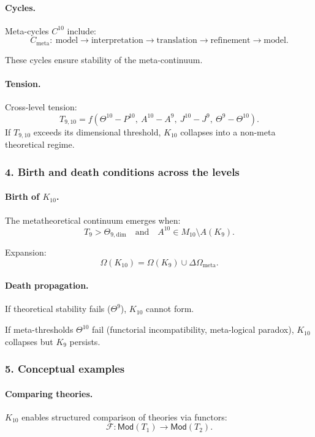 \paragraph{Cycles.}
Meta-cycles $C^{10}$ include:
\[
C_{\mathrm{meta}}:\
\text{model} \rightarrow \text{interpretation} \rightarrow \text{translation}
\rightarrow \text{refinement} \rightarrow \text{model}.
\]

These cycles ensure stability of the meta-continuum.

\paragraph{Tension.}
Cross-level tension:
\[
T_{9,10} =
f(\Theta^{10} - P^{10},\ A^{10} - A^9,\
  J^{10} - J^9,\ \Theta^9 - \Theta^{10}).
\]
If $T_{9,10}$ exceeds its dimensional threshold, $K_{10}$ collapses into a
non-meta theoretical regime.

\subsubsection{4. Birth and death conditions across the levels}

\paragraph{Birth of $K_{10}$.}
The metatheoretical continuum emerges when:
\[
T_9 > \Theta_{9,\mathrm{dim}}
\quad\text{and}\quad
A^{10} \in M_{10} \setminus A(K_9).
\]

Expansion:
\[
\Omega(K_{10}) = \Omega(K_9) \cup \Delta\Omega_{\mathrm{meta}}.
\]

\paragraph{Death propagation.}
If theoretical stability fails ($\Theta^9$), $K_{10}$ cannot form.

If meta-thresholds $\Theta^{10}$ fail (functorial incompatibility,
meta-logical paradox), $K_{10}$ collapses but $K_9$ persists.

\subsubsection{5. Conceptual examples}

\paragraph{Comparing theories.}
$K_{10}$ enables structured comparison of theories via functors:
\[
\mathcal{F} : \mathsf{Mod}(T_1) \rightarrow \mathsf{Mod}(T_2).
\]

